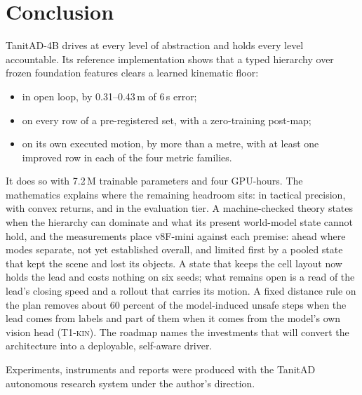 \documentclass[10pt,twocolumn]{article}
\makeatletter
\theoremstyle{remark}
\newcommand{\tier}[1]{\textsc{\small #1}}
\renewcommand\paragraph{\@startsection{paragraph}{4}{\z@}{1.6ex \@plus .5ex \@minus .2ex}{-1em}{\normalfont\normalsize\bfseries}}
\makeatother
\begin{document}
\section{Conclusion}
TanitAD-4B drives at every level of abstraction and holds every level accountable. Its reference implementation shows that a typed
hierarchy over frozen foundation features clears a learned kinematic floor:
\begin{itemize}
  \item in open loop, by 0.31--0.43\,m of 6\,s error;
  \item on every row of a pre-registered set, with a zero-training post-map;
  \item on its own executed motion, by more than a metre, with at least one improved row in each of the four metric families.
\end{itemize}
It does so with 7.2\,M trainable parameters and four GPU-hours. The mathematics explains where the remaining headroom sits: in
tactical precision, with convex returns, and in the evaluation tier. A machine-checked theory states when the hierarchy can
dominate and what its present world-model state cannot hold, and the measurements place v8F-mini against each premise: ahead
where modes separate, not yet established overall, and limited first by a pooled state that kept the scene and lost its objects.
A state that keeps the cell layout now holds the lead and costs nothing on six seeds; what remains open is a read of the lead's closing speed and a rollout that carries its motion. A fixed distance rule on the plan removes about 60 percent of the model-induced unsafe steps when the lead comes from labels and part of them when it comes from the model's own vision head (\tier{T1-kin}). The roadmap names the investments that will convert the
architecture into a deployable, self-aware driver.

\paragraph{Acknowledgements.} Experiments, instruments and reports were produced with the TanitAD autonomous research system under
the author's direction.
\end{document}
